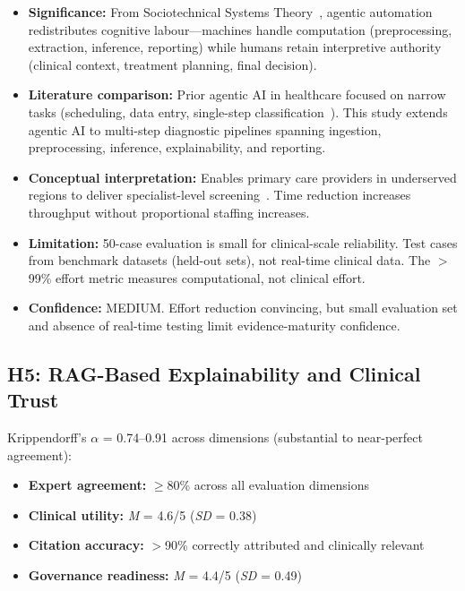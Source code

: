 \begin{itemize}
    \item \textbf{Significance:} From Sociotechnical Systems Theory~\cite{trist1951social}, agentic automation redistributes cognitive labour---machines handle computation (preprocessing, extraction, inference, reporting) while humans retain interpretive authority (clinical context, treatment planning, final decision).
    \item \textbf{Literature comparison:} Prior agentic AI in healthcare focused on narrow tasks (scheduling, data entry, single-step classification~\cite{wang2024agentai}). This study extends agentic AI to multi-step diagnostic pipelines spanning ingestion, preprocessing, inference, explainability, and reporting.
    \item \textbf{Conceptual interpretation:} Enables primary care providers in underserved regions to deliver specialist-level screening~\cite{rajkomar2019healthcare}. Time reduction increases throughput without proportional staffing increases.
    \item \textbf{Limitation:} 50-case evaluation is small for clinical-scale reliability. Test cases from benchmark datasets (held-out sets), not real-time clinical data. The $>$99\% effort metric measures computational, not clinical effort.
    \item \textbf{Confidence:} MEDIUM. Effort reduction convincing, but small evaluation set and absence of real-time testing limit evidence-maturity confidence.
\end{itemize}

\subsection{H5: RAG-Based Explainability and Clinical Trust}

Krippendorff's $\alpha$ = 0.74--0.91 across dimensions (substantial to near-perfect agreement):

\begin{itemize}
    \item \textbf{Expert agreement:} $\geq$80\% across all evaluation dimensions
    \item \textbf{Clinical utility:} \textit{M} = 4.6/5 (\textit{SD} = 0.38)
    \item \textbf{Citation accuracy:} $>$90\% correctly attributed and clinically relevant
    \item \textbf{Governance readiness:} \textit{M} = 4.4/5 (\textit{SD} = 0.49)
\end{itemize}


